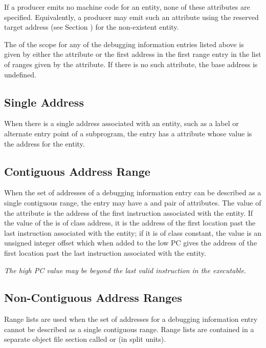 \bb
If a producer emits no machine code for an entity, none of these
attributes are specified. Equivalently, a producer may emit such an
attribute using the reserved target address (see Section 
) for the non-existent entity.
\eb

The  of the scope for any of the
debugging information entries listed above is given by either the 
\DWATlowpcNAME{} 
attribute or the first address in the first range entry 
in the list of ranges given by the \DWATrangesNAME{} attribute.
If there is no such attribute, the base address is undefined.

\subsection{Single Address}
\label{chap:singleaddress} 
When there is a single address associated with an entity,
such as a label or alternate entry point of a subprogram,
the entry has a \DWATlowpc{} attribute whose value is the
address for the entity.

\subsection{Contiguous Address Range}
\label{chap:contiguousaddressranges}
When the set of addresses of a debugging information entry can
be described as a single contiguous range, the entry may
have a \DWATlowpc{} and \DWAThighpc{} pair of attributes. 
The value of the \DWATlowpc{} attribute is the address of the
first instruction associated with the entity. If the value of
the \DWAThighpc{} is of class address, it is the 
address of the first location past the last instruction
associated with the entity; if it is of class constant, the
value is an unsigned integer offset which when added to the
low PC gives the address of the first location past the last
instruction associated with the entity.

\textit{The high PC value
may be beyond the last valid instruction in the executable.}

\subsection{Non-Contiguous Address Ranges}
\label{chap:noncontiguousaddressranges}
Range lists are used when the set of addresses for a debugging
information entry cannot be described as a single contiguous 
range.
Range lists are contained in a separate object file section
called \dotdebugrnglists{} or \dotdebugrnglistsdwo{} (in split units).
 
